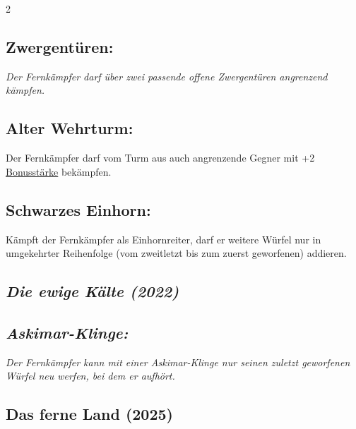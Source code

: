 \documentclass[10pt, a4paper, oneside]{book}
\newcommand{\fan}[1]{\textit{#1}}
\begin{document}
\begin{multicols*}{2}
\begin{bgcolor}[color-DZ]
\subsection{Zwergentüren:}

\fan{Der Fernkämpfer darf über zwei passende offene Zwergentüren angrenzend kämpfen.}


\subsection{Alter Wehrturm:}

Der Fernkämpfer darf vom Turm aus auch angrenzende Gegner mit +2 \hyperref[Bonusstärke]{Bonusstärke} bekämpfen.
\supercite{DZ:Begleitheft}


\subsection{Schwarzes Einhorn:}

Kämpft der Fernkämpfer als Einhornreiter, darf er weitere Würfel nur in umgekehrter Reihenfolge (vom zweitletzt bis zum zuerst geworfenen) addieren.
\supercite{DZ:Begleitheft}



\end{bgcolor}







\begin{bgcolor}
\section{\fan{Die ewige Kälte (2022)}}

\subsection{\fan{Askimar-Klinge:}}

\fan{Der Fernkämpfer kann mit einer Askimar-Klinge nur seinen zuletzt geworfenen Würfel neu werfen, bei dem er aufhört.}

\end{bgcolor}





\begin{bgcolor}
\section{Das ferne Land (2025)}



\end{bgcolor}
\end{multicols*}
\end{document}
